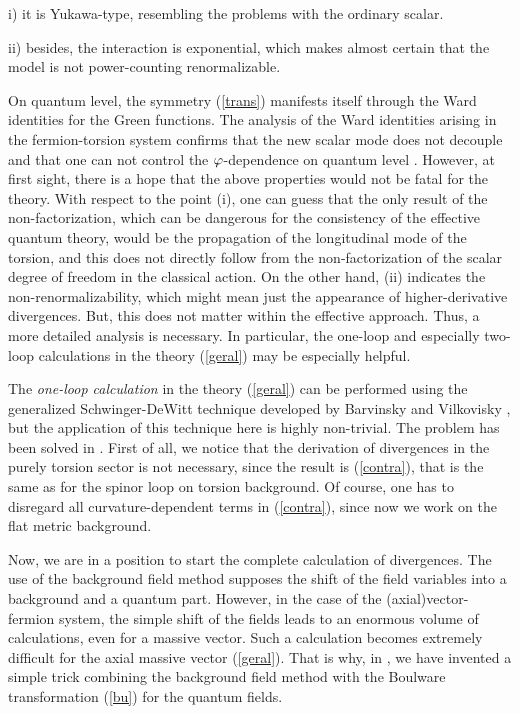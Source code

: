 \noindent
i) it is Yukawa-type, resembling the problems with the ordinary scalar.

\noindent
ii) besides, the interaction is exponential, which makes almost certain 
that the model is not power-counting renormalizable.
\vskip 1mm

On quantum level, the symmetry (\ref{trans}) manifests itself through 
the Ward identities for the Green functions. The analysis of the 
Ward identities arising in the fermion-torsion system confirms
that the new scalar mode does not decouple and that one can not 
control the $\varphi$-dependence on quantum level \cite{guhesh}. 
However, at first sight, there is a hope that the above properties
would not be fatal for the theory. With respect to the point (i), 
one can guess that the only result of the non-factorization, which
can be dangerous for the consistency of the effective quantum theory,
would be the propagation of the longitudinal mode of the torsion, and this
does not directly follow from the non-factorization of the scalar
degree of freedom in the classical action. On the other hand,
(ii) indicates the non-renormalizability, which might mean just the
appearance of higher-derivative divergences. But, this does not 
matter within the effective approach. Thus, a more detailed analysis
is necessary. In particular, the one-loop and especially two-loop 
calculations in the theory (\ref{geral}) may be especially helpful.
\vskip 3mm

The {\it one-loop calculation} in the theory (\ref{geral})
can be performed using the generalized Schwinger-DeWitt technique
developed by Barvinsky and Vilkovisky \cite{bavi}, 
but the application of this
technique here is highly non-trivial. The problem has been solved in
\cite{guhesh}. First of all, we notice that the derivation of 
divergences in the purely torsion sector is not necessary, since
the result is (\ref{contra}), that is the same as for the spinor 
loop on torsion background. Of course, one has to disregard all
curvature-dependent terms in (\ref{contra}), since now we work on 
the flat metric background.


Now, we are in a position to start the complete calculation of 
divergences. The use of the background field method supposes the
shift of the field variables into a background and a
quantum part. However, in the case of the (axial)vector-fermion
system, the simple shift of the fields leads to an enormous volume of
calculations, even for a massive vector. Such a calculation becomes
extremely difficult for the axial massive vector (\ref{geral}).
That is why, in \cite{guhesh}, we have invented a simple trick 
combining the background field method with the Boulware transformation
(\ref{bu}) for the quantum fields. 

